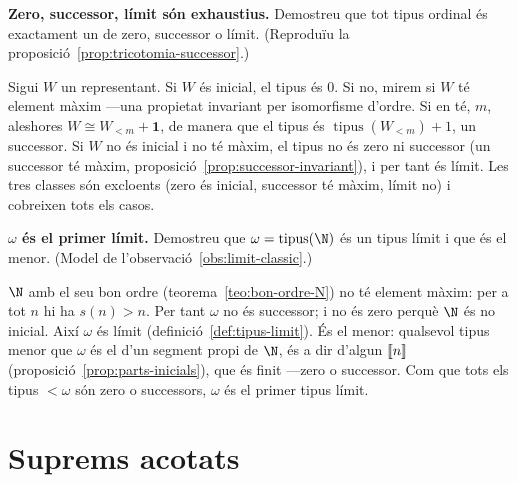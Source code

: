 \begin{exercici}
\textbf{Zero, successor, límit són exhaustius.} Demostreu que tot tipus ordinal és exactament un de zero, successor o límit. (Reproduïu la proposició~\ref{prop:tricotomia-successor}.)
\end{exercici}
\begin{solucio}
Sigui \(W\) un representant. Si \(W\) és inicial, el tipus és \(0\). Si no, mirem si \(W\) té element màxim ---una propietat invariant per isomorfisme d'ordre. Si en té, \(m\), aleshores \(W\cong W_{<m}+\mathbf1\), de manera que el tipus és \(\operatorname{tipus}(W_{<m})+1\), un successor. Si \(W\) no és inicial i no té màxim, el tipus no és zero ni successor (un successor té màxim, proposició~\ref{prop:successor-invariant}), i per tant és límit. Les tres classes són excloents (zero és inicial, successor té màxim, límit no) i cobreixen tots els casos.
\end{solucio}

\begin{exercici}
\textbf{\(\omega\) és el primer límit.} Demostreu que \(\omega=\operatorname{tipus}(\N)\) és un tipus límit i que és el menor. (Model de l'observació~\ref{obs:limit-classic}.)
\end{exercici}
\begin{solucio}
\(\N\) amb el seu bon ordre (teorema~\ref{teo:bon-ordre-N}) no té element màxim: per a tot \(n\) hi ha \(s(n)>n\). Per tant \(\omega\) no és successor; i no és zero perquè \(\N\) és no inicial. Així \(\omega\) és límit (definició~\ref{def:tipus-limit}). És el menor: qualsevol tipus menor que \(\omega\) és el d'un segment propi de \(\N\), és a dir d'algun \(\llbracket n\rrbracket\) (proposició~\ref{prop:parts-inicials}), que és finit ---zero o successor. Com que tots els tipus \(<\omega\) són zero o successors, \(\omega\) és el primer tipus límit.
\end{solucio}

\section{Suprems acotats}\label{prac:suprems}

